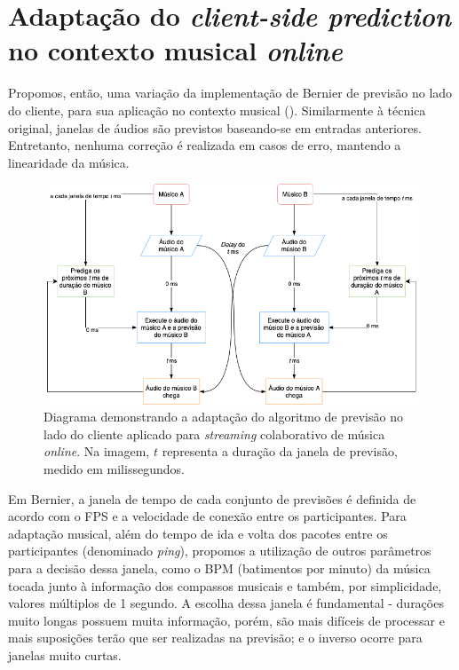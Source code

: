 \section{Adaptação do \textit{client-side prediction} no contexto musical \textit{online}}

Propomos, então, uma variação da implementação de Bernier \cite{client-side-prediction} de previsão no lado do cliente, para sua aplicação no contexto musical (). Similarmente à técnica original, janelas de áudios são previstos baseando-se em entradas anteriores. Entretanto, nenhuma correção é realizada em casos de erro, mantendo a linearidade da música.

\begin{figure}[htbp]
\centering
\includegraphics[width=1\textwidth]{images/rollback-music.png}
\caption{Diagrama demonstrando a adaptação do algoritmo de previsão no lado do cliente aplicado para \textit{streaming} colaborativo de música \textit{online}. Na imagem, $t$ representa a duração da janela de previsão, medido em milissegundos.}
\label{fig:rollback_music_diagram}
\end{figure}

Em Bernier, a janela de tempo de cada conjunto de previsões é definida de acordo com o FPS e a velocidade de conexão entre os participantes. Para adaptação musical, além do tempo de ida e volta dos pacotes entre os participantes (denominado \textit{ping}), propomos a utilização de outros parâmetros para a decisão dessa janela, como o BPM (batimentos por minuto) da música tocada junto à informação dos compassos musicais e também, por simplicidade, valores múltiplos de 1 segundo. A escolha dessa janela é fundamental - durações muito longas possuem muita informação, porém, são mais difíceis de processar e mais suposições terão que ser realizadas na previsão; e o inverso ocorre para janelas muito curtas.

